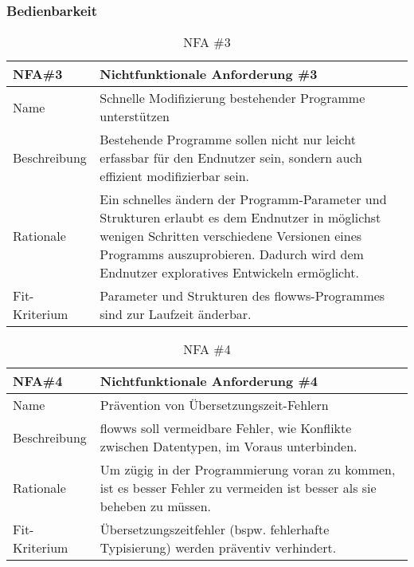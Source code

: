 \subsubsection{Bedienbarkeit}
\begin{table}[H]
\caption{NFA \#3}
\label{tab:NFA3}
\begin{tabularx}{\textwidth}{lX}
\hline
\rowcolor[HTML]{EFEFEF} 
NFA\#3        & Nichtfunktionale Anforderung \#3 \\ \hline
Name          & Schnelle Modifizierung bestehender Programme unterstützen \\ \hline
Beschreibung  & Bestehende Programme sollen nicht nur leicht erfassbar für den Endnutzer sein, sondern auch effizient modifizierbar sein. \\ \hline
Rationale     &   Ein schnelles ändern der Programm-Parameter und Strukturen erlaubt es dem Endnutzer in möglichst wenigen Schritten verschiedene Versionen eines Programms auszuprobieren. Dadurch wird dem Endnutzer exploratives Entwickeln ermöglicht.\\ \hline
Fit-Kriterium & Parameter und Strukturen des flowws-Programmes sind zur Laufzeit änderbar. \\ \hline 
\end{tabularx}
\end{table}

\begin{table}[H]
\caption{NFA \#4}
\label{tab:NFA4}
\begin{tabularx}{\textwidth}{lX}
\hline
\rowcolor[HTML]{EFEFEF} 
NFA\#4        & Nichtfunktionale Anforderung \#4 \\ \hline
Name          & Prävention von Übersetzungszeit-Fehlern \\ \hline
Beschreibung  & flowws soll vermeidbare Fehler, wie Konflikte zwischen Datentypen, im Voraus unterbinden. \\ \hline
Rationale     & Um zügig in der Programmierung voran zu kommen, ist es besser Fehler zu vermeiden ist besser als sie beheben zu müssen. \\ \hline
Fit-Kriterium & Übersetzungszeitfehler (bspw. fehlerhafte Typisierung) werden präventiv verhindert.   \\ \hline
\end{tabularx}
\end{table}

